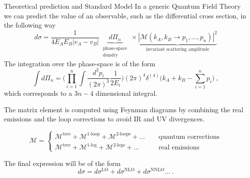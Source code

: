 \documentclass[t,handout,professionalfont,serif]{beamer}
\begin{document}
\begin{frame}{Theoretical prediction and Standard Model}
	\scriptsize
	In a generic Quantum Field Theory we can predict the value of an observable, such as the differential cross section, in the following way
	\begin{equation}
		\label{sigma}
		d \sigma = \frac{1}{4 E_A E_B |v_A - v_B|} \  \underbrace{~ d\Pi_n ~}_{\substack{\text{phase-space}\\ \text{density}}} ~ \times   
		\underbrace{|\mathcal{M}(k_A, k_B \to p_1, ..., p_n)|^2}_{\text{invariant scattering amplitude}}  
	\end{equation}
	The integration over the phase-space is of the form 
	\begin{equation}
		\int d\Pi_n  = \bigg( \prod_{i=1}^{n}\int
		\frac{d^3 p_i}{(2 \pi)^3}
		\frac{1}{2 E_i} \bigg) (2\pi)^4 \delta^{(4)}\big(k_A+ k_B- \sum_{i=1}^n p_i\big) \ ,
	\end{equation} 
	which corresponds to a $3n-4$ dimensional integral.
	
	The matrix element is computed using Feynman diagrams by combining the real emissions and the loop corrections to avoid IR and UV divergences.
	
	
	
	
	\begin{equation}
		\mathcal{M} = 
		\begin{cases}
			\mathcal{M}^{\text{tree}}  + \mathcal{M}^{\text{1-loop}} + \mathcal{M}^{\text{2-loops}} + \dots \  \quad &\text{quantum corrections} \\
			\mathcal{M}^{\text{tree}}  + \mathcal{M}^{\text{1-leg}} + \mathcal{M}^{\text{2-legs}} + \dots  \quad &\text{real emissions}
		\end{cases}
	\end{equation}
	
	The final expression will be of the form
	\begin{equation}
		d\sigma = d\sigma^{\text{LO}} + d\sigma^{\text{NLO}} + d\sigma^{\text{NNLO}} \dots  \ .
	\end{equation}
	
\end{frame}
\end{document}
